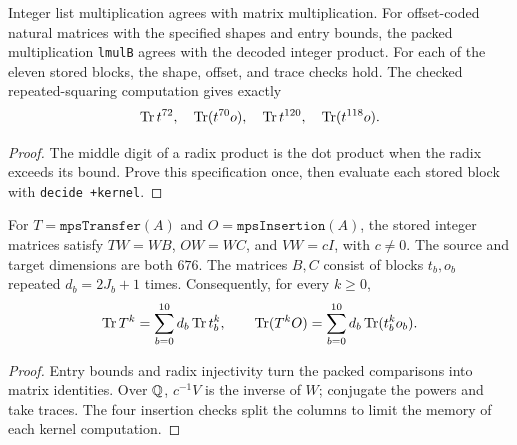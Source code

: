 \begin{lemma}
  \label{lem:kernel-trial-arithmetic}
  \leanok
  Integer list multiplication agrees with matrix multiplication.
  For offset-coded natural matrices with the specified shapes and entry bounds,
  the packed multiplication \texttt{lmulB} agrees with the decoded integer product.
  For each of the eleven stored blocks, the shape, offset, and trace checks hold.
  The checked repeated-squaring computation gives exactly
  \[
    \operatorname{Tr} t^{72},\quad \operatorname{Tr}(t^{70}o),\quad
    \operatorname{Tr} t^{120},\quad \operatorname{Tr}(t^{118}o).
  \]
\end{lemma}
\begin{proof}
  \leanok
  The middle digit of a radix product is the dot product when the radix exceeds its bound.
  Prove this specification once, then evaluate each stored block with \texttt{decide +kernel}.
\end{proof}

\begin{lemma}
  \label{lem:kernel-trial-reduction}
  \leanok
  For \(T=\texttt{mpsTransfer}(A)\) and \(O=\texttt{mpsInsertion}(A)\), the stored integer
  matrices satisfy \(TW=WB\), \(OW=WC\), and \(VW=cI\), with \(c\ne0\).
  The source and target dimensions are both \(676\).
  The matrices \(B,C\) consist of blocks \(t_b,o_b\) repeated \(d_b=2J_b+1\) times.
  Consequently, for every \(k\ge0\),
  \[
    \operatorname{Tr} T^k=\sum_{b=0}^{10}d_b\operatorname{Tr} t_b^k,\qquad
    \operatorname{Tr}(T^kO)=\sum_{b=0}^{10}d_b\operatorname{Tr}(t_b^ko_b).
  \]
\end{lemma}
\begin{proof}
  \leanok
  Entry bounds and radix injectivity turn the packed comparisons into matrix identities.
  Over \(\mathbb{Q}\), \(c^{-1}V\) is the inverse of \(W\); conjugate the powers and take traces.
  The four insertion checks split the columns to limit the memory of each kernel computation.
\end{proof}

